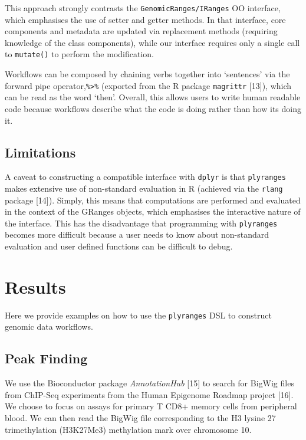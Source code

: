 \documentclass[10pt,letterpaper]{article}
\begin{document}
This approach strongly contrasts the \texttt{GenomicRanges/IRanges} OO
interface, which emphasises the use of setter and getter methods. In
that interface, core components and metadata are updated via replacement
methods (requiring knowledge of the class components), while our
interface requires only a single call to \texttt{mutate()} to perform
the modification.

Workflows can be composed by chaining verbs together into `sentences'
via the forward pipe operator,\texttt{\%\textgreater{}\%} (exported from
the R package \texttt{magrittr} {[}13{]}), which can be read as the word
`then'. Overall, this allows users to write human readable code because
workflows describe what the code is doing rather than how its doing it.

\subsection{Limitations}\label{limitations}

A caveat to constructing a compatible interface with \texttt{dplyr} is
that \texttt{plyranges} makes extensive use of non-standard evaluation
in R (achieved via the \texttt{rlang} package {[}14{]}). Simply, this
means that computations are performed and evaluated in the context of
the GRanges objects, which emphasises the interactive nature of the
interface. This has the disadvantage that programming with
\texttt{plyranges} becomes more difficult because a user needs to know
about non-standard evaluation and user defined functions can be
difficult to debug.

\section{Results}\label{results}

Here we provide examples on how to use the \texttt{plyranges} DSL to
construct genomic data workflows.

\subsection{Peak Finding}\label{peak-finding}

We use the Bioconductor package \emph{AnnotationHub} {[}15{]} to search
for BigWig files from ChIP-Seq experiments from the Human Epigenome
Roadmap project {[}16{]}. We choose to focus on assays for primary T
CD8+ memory cells from peripheral blood. We can then read the BigWig
file corresponding to the H3 lysine 27 trimethylation (H3K27Me3)
methylation mark over chromosome 10.
\end{document}
